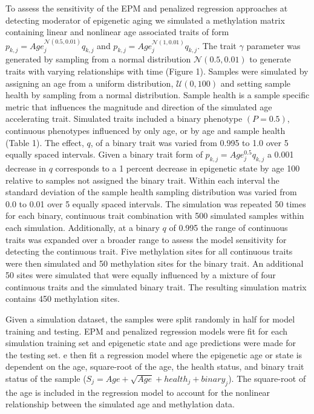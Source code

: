 \documentclass{article}
\begin{document}
{\begin{linenumbers}
To assess the sensitivity of the EPM and penalized regression approaches at detecting moderator of epigenetic aging we 
simulated a methylation matrix containing linear and nonlinear age associated traits of form 
$p_{k,j} = Age_j^{\mathcal{N}(0.5, 0.01)} q_{k,j}$ and $p_{k,j} = Age_j^{\mathcal{N}(1, 0.01)} q_{k,j}$. The 
trait $\gamma$ parameter was generated by sampling from a normal distribution $\mathcal{N}(0.5, 0.01)$ to generate 
traits with varying relationships with time (Figure 1). Samples were simulated by assigning an age from a uniform 
distribution, $\mathcal{U}(0,100)$ and setting sample health  by sampling from a normal distribution. Sample health 
is a sample specific metric that influences the magnitude and direction of the simulated age accelerating trait. 
Simulated traits included a binary phenotype  $(P=0.5)$, continuous phenotypes influenced by only age, or by age and 
sample health (Table 1). The effect, $q$, of a binary trait was varied from 0.995 to 1.0 over 5 equally spaced 
intervals. Given a binary trait form of $p_{k,j} = Age_j^{0.5} q_{k,j}$ a 0.001 decrease in $q$ corresponds to a 
1 percent decrease in epigenetic state by age 100 relative to samples not assigned the binary trait. Within each 
interval the standard deviation of the sample health sampling distribution was varied from 0.0 to 0.01 over 5 
equally spaced intervals. The simulation was repeated 50 times for each binary, continuous trait combination with 
500 simulated samples within each simulation. Additionally, at a binary $q$ of 0.995 the range of continuous traits 
was expanded over a broader range to assess the model sensitivity for detecting the continuous trait. Five methylation 
sites for all continuous traits were then simulated and 50 methylation sites for the binary trait. An additional 50 
sites were simulated that were equally influenced by a mixture of four continuous traits and the simulated  binary 
trait. The resulting simulation matrix contains 450 methylation sites. 

Given a simulation dataset, the samples were split randomly in half for model training and testing. EPM and penalized 
regression models were fit for each simulation training set and epigenetic state and age predictions were made for the 
testing set. e then fit a regression model where the epigenetic age or state is dependent on the age, square-root of 
the age, the health status, and binary trait status of the sample ($S_j  = Age + \sqrt{Age} + health_j + binary_j$). 
The square-root of the age is included in the regression model to account for the nonlinear relationship between the 
simulated age and methylation data. 


\end{linenumbers}}
\end{document}
